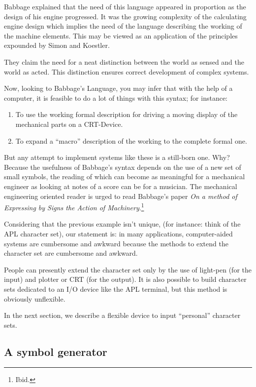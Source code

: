 \documentclass[openany,nobib]{tufte-book}
\begin{document}
Babbage explained that the need of this language appeared in proportion as the
design of his engine progressed. It was the growing complexity of the
calculating engine design which implies the need of the language describing the
working of the machine elements. This may be viewed as an application of the
principles expounded by Simon and Koestler.

They claim the need for a neat distinction between the world as sensed and the
world as acted. This distinction ensures correct development of complex
systems.

Now, looking to Babbage's Language, you may infer that with the help of a
computer, it is feasible to do a lot of things with this syntax; for instance:
\begin{enumerate}
    \item To use the working formal description for driving a moving display of
the mechanical parts on a CRT-Device.
    \item To expand a ``macro'' description of the working to the complete
formal one.
\end{enumerate}
But any attempt to implement systems like these is a still-born one. Why?
Because the usefulness of Babbage's syntax depends on the use of a new set of
small symbols, the reading of which can become as meaningful for a mechanical
engineer as looking at notes of a score can be for a musician. The mechanical
engineering oriented reader is urged to read Babbage's paper {\it On a method
of Expressing by Signs the Action of Machinery}.\footnote{Ibid.}

Considering that the previous example isn't unique, (for instance: think of the
APL character set), our statement is: in many applications, computer-aided
systems are cumbersome and awkward because the methods to extend the character
set are cumbersome and awkward.

People can presently extend the character set only by the use of light-pen (for
the input) and plotter or CRT (for the output). It is also possible to build
character sets dedicated to an I/O device like the APL terminal, but this
method is obviously unflexible.

In the next section, we describe a flexible device to input ``personal''
character sets.

\subsection{A symbol generator}
\end{document}
